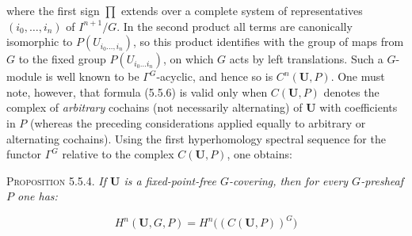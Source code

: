where the first sign $\displaystyle\prod$ extends over a complete system of representatives
$(i_0,\ldots,i_n)$ of $I^{n+1}/G$. In the second product all terms are
canonically isomorphic to $P(U_{i_0\ldots,i_n})$, so this product identifies
with the group of maps from $G$ to the fixed group $P(U_{i_0\ldots i_n})$, on
which $G$ acts by left translations. Such a $G$-module is well known to be
$\Gamma^G$-acyclic, and hence so is $C^n({\mathbf U},P)$. One must note,
however, that formula (5.5.6) is valid only when $C({\mathbf U},P)$ denotes the
complex of \emph{arbitrary} cochains (not necessarily alternating) of ${\mathbf U}$
with coefficients in $P$ (whereas the preceding considerations applied
equally to arbitrary or alternating cochains). Using the first hyperhomology
spectral sequence for the functor $\Gamma^G$ relative to the complex
$C({\mathbf U},P)$, one obtains:

\textsc{Proposition 5.5.4.} \textit{If ${\mathbf U}$ is a
fixed-point-free $G$-covering, then for every $G$-presheaf $P$ one has:}

\[
\tag{5.5.7}
H^n({\mathbf U},G,P)=H^n\bigl((C({\mathbf U},P))^G\bigr)
\]

